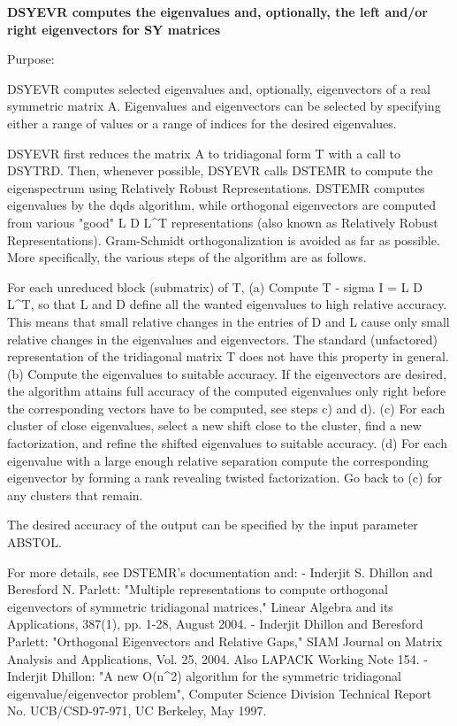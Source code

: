 {\bfseries  D\+S\+Y\+E\+V\+R computes the eigenvalues and, optionally, the left and/or right eigenvectors for S\+Y matrices} 

 \begin{DoxyParagraph}{Purpose\+: }
\begin{DoxyVerb} DSYEVR computes selected eigenvalues and, optionally, eigenvectors
 of a real symmetric matrix A.  Eigenvalues and eigenvectors can be
 selected by specifying either a range of values or a range of
 indices for the desired eigenvalues.

 DSYEVR first reduces the matrix A to tridiagonal form T with a call
 to DSYTRD.  Then, whenever possible, DSYEVR calls DSTEMR to compute
 the eigenspectrum using Relatively Robust Representations.  DSTEMR
 computes eigenvalues by the dqds algorithm, while orthogonal
 eigenvectors are computed from various "good" L D L^T representations
 (also known as Relatively Robust Representations). Gram-Schmidt
 orthogonalization is avoided as far as possible. More specifically,
 the various steps of the algorithm are as follows.

 For each unreduced block (submatrix) of T,
    (a) Compute T - sigma I  = L D L^T, so that L and D
        define all the wanted eigenvalues to high relative accuracy.
        This means that small relative changes in the entries of D and L
        cause only small relative changes in the eigenvalues and
        eigenvectors. The standard (unfactored) representation of the
        tridiagonal matrix T does not have this property in general.
    (b) Compute the eigenvalues to suitable accuracy.
        If the eigenvectors are desired, the algorithm attains full
        accuracy of the computed eigenvalues only right before
        the corresponding vectors have to be computed, see steps c) and d).
    (c) For each cluster of close eigenvalues, select a new
        shift close to the cluster, find a new factorization, and refine
        the shifted eigenvalues to suitable accuracy.
    (d) For each eigenvalue with a large enough relative separation compute
        the corresponding eigenvector by forming a rank revealing twisted
        factorization. Go back to (c) for any clusters that remain.

 The desired accuracy of the output can be specified by the input
 parameter ABSTOL.

 For more details, see DSTEMR's documentation and:
 - Inderjit S. Dhillon and Beresford N. Parlett: "Multiple representations
   to compute orthogonal eigenvectors of symmetric tridiagonal matrices,"
   Linear Algebra and its Applications, 387(1), pp. 1-28, August 2004.
 - Inderjit Dhillon and Beresford Parlett: "Orthogonal Eigenvectors and
   Relative Gaps," SIAM Journal on Matrix Analysis and Applications, Vol. 25,
   2004.  Also LAPACK Working Note 154.
 - Inderjit Dhillon: "A new O(n^2) algorithm for the symmetric
   tridiagonal eigenvalue/eigenvector problem",
   Computer Science Division Technical Report No. UCB/CSD-97-971,
   UC Berkeley, May 1997.



\end{DoxyVerb}
\end{DoxyParagraph}
